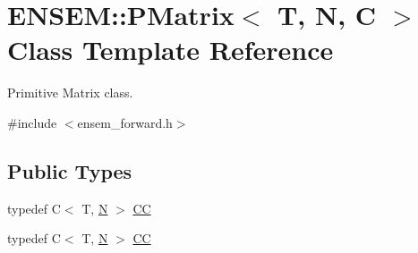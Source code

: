 \hypertarget{classENSEM_1_1PMatrix}{}\section{E\+N\+S\+EM\+:\+:P\+Matrix$<$ T, N, C $>$ Class Template Reference}
\label{classENSEM_1_1PMatrix}


Primitive Matrix class.  




{\ttfamily \#include $<$ensem\+\_\+forward.\+h$>$}

\subsection*{Public Types}
\begin{DoxyCompactItemize}
\item 
typedef C$<$ T, \mbox{\hyperlink{operator__name__util_8cc_a7722c8ecbb62d99aee7ce68b1752f337}{N}} $>$ \mbox{\hyperlink{classENSEM_1_1PMatrix_a744bac549029029effe32dc1705660ec}{CC}}
\item 
typedef C$<$ T, \mbox{\hyperlink{operator__name__util_8cc_a7722c8ecbb62d99aee7ce68b1752f337}{N}} $>$ \mbox{\hyperlink{classENSEM_1_1PMatrix_a744bac549029029effe32dc1705660ec}{CC}}
\end{DoxyCompactItemize}
